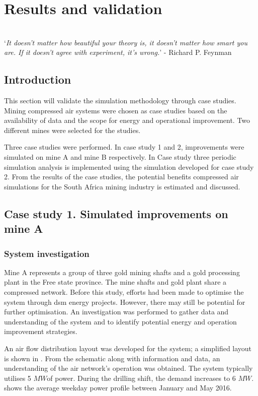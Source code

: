 \chapter{Results and validation}
\thispagestyle{empty}
\vspace{38em}
\hrulefill
\\

\enquote*{\textit{It doesn't matter how beautiful your theory is, it doesn't matter how smart you are. If it doesn't agree with experiment, it's wrong.}} - Richard P. Feynman\\
\newpage
\section{Introduction}
This section will validate the simulation methodology through case studies. Mining compressed air systems were chosen as case studies based on the availability of data and the scope for energy and operational improvement. Two different mines were selected for the studies. 
\par 
Three case studies were performed. In case study 1 and 2, improvements were simulated on mine A and mine B respectively. In Case study three periodic simulation analysis is implemented using the simulation developed for case study 2. From the results of the case studies, the potential benefits compressed air simulations for the South Africa mining industry is estimated and discussed.

\section{Case study 1. Simulated improvements on mine A}
\subsection{System investigation}
Mine A represents a group of three gold mining shafts and a gold processing plant in the Free state province. The mine shafts and gold plant share a compressed network. Before this study, efforts had been made to optimise the system through \gls{dsm} energy projects. However, there may still be potential for further optimisation. An investigation was performed to gather data and understanding of the system and to identify potential energy and operation improvement strategies.
\par 
An air flow distribution layout was developed for the system; a simplified layout is shown in . From the schematic along with information and data, an understanding of the air network’s operation was obtained. The system typically utilises 5 $MW$of power. During the drilling shift, the demand increases to 6 $MW$.  shows the average weekday power profile between January and May 2016.

